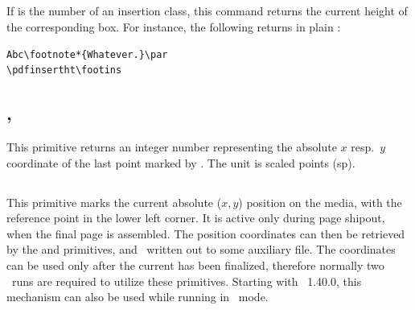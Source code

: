 \documentclass{pdftexmanual}
\begin{document}
\subsection{}

If  is the number of an insertion class, this command
returns the current height of the corresponding box. For instance, the
following returns \type{12pt} in plain \TEX:

\begin{verbatim}
Abc\footnote*{Whatever.}\par
\pdfinsertht\footins
\end{verbatim}

\subsection{, }

This primitive returns an integer number representing the absolute $x$
resp.\ $y$ coordinate of the last point marked by . The
unit is scaled points (sp).

\subsection{}

This primitive marks the current absolute ($x,y$) position on the media,
with the reference point in the lower left corner. It is active only
during page shipout, when the final page is assembled. The position
coordinates can then be retrieved by the  and
 primitives, and \eg\ written out to some auxiliary
file. The coordinates can be used only after the current 
has been finalized, therefore normally two \PDFTEX\ runs are required to
utilize these primitives. Starting with \PDFTEX\ 1.40.0, this mechanism
can also be used while running in \DVI\ mode.

\subsection{}
\end{document}

